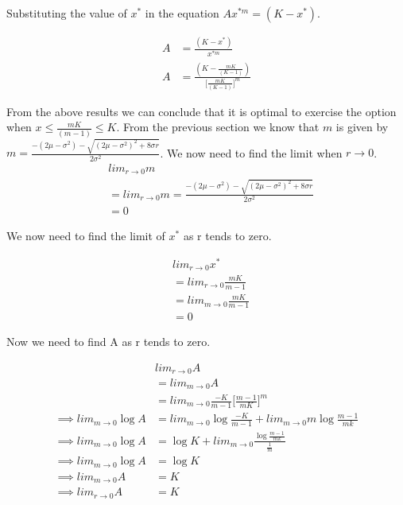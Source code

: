 \documentclass[12pt]{report}
\begin{document}
Substituting the value of $x^*$ in the equation $  Ax^{*m} = (K-x^*)$.

\begin{equation*}
	\begin{aligned}
	A & = \frac{(K-x^*)}{x^{*m}} \\
	A &=  \frac{(K - \frac{mK}{(K-1)})}{\Big[\frac{mK}{(K-1)}\Big]^m}
	\end{aligned}
\end{equation*} 

From the above results we can conclude that it is optimal to exercise the option when $x \leq \frac{mK}{(m-1)} \leq K$.
\linebreak
\linebreak
From the previous section we know that $m$ is given by $m = \frac{-(2\mu - \sigma^2) - \sqrt{(2\mu - \sigma^2)^2 + 8\sigma r} }{2\sigma^2}$. We now need to find the limit when $r\rightarrow 0$. 
\begin{equation*}
	\begin{aligned}
		&lim_{r \rightarrow 0} m \\
		&= lim_{r \rightarrow 0} m = \frac{-(2\mu - \sigma^2) - \sqrt{(2\mu - \sigma^2)^2 + 8\sigma r} }{2\sigma^2}\\
		&= 0 
	\end{aligned}
\end{equation*}

We  now need to find the limit of $x^*$ as r tends to zero.

\begin{equation*}
	\begin{aligned}
		&lim_{r \rightarrow 0} x^*\\
		&= lim_{r \rightarrow 0} \frac{mK}{m-1} \\
		&= lim_{m \rightarrow 0} \frac{mK}{m-1} \\
		&= 0
	\end{aligned}
\end{equation*}

Now we need to find A as r tends to zero.

\begin{equation*}
\begin{aligned}
	&lim_{r \rightarrow 0} A\\
	&= lim_{m \rightarrow 0}  A \\
	&= lim_{m \rightarrow 0} \frac{-K}{m-1} \Big[\frac{m-1}{mK} \Big]^m\\
	\implies lim_{m \rightarrow 0} \log A &= lim_{m \rightarrow 0} \log\frac{-K}{m-1} + lim_{m \rightarrow 0} m \log \frac{m-1}{mk} \\
	\implies lim_{m \rightarrow 0} \log A &= \log K + lim_{m \rightarrow 0} \frac{\log \frac{m-1}{mk}}{\frac{1}{m}} \\ 
	\implies lim_{m \rightarrow 0} \log A &= \log K	\\
	\implies lim_{m \rightarrow 0} A &= K\\
	\implies lim_{r \rightarrow 0} A &= K
\end{aligned}
\end{equation*}
\end{document}
